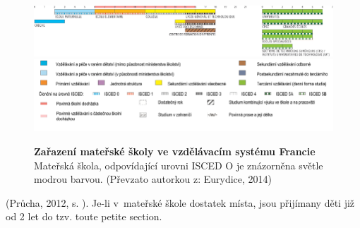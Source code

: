 		\begin{figure} [h!]
			\center
			\includegraphics[width=1.0\linewidth]{fotky/msFR.png} \\
			\includegraphics[width=1.0\linewidth]{fotky/msVysvetlivky.png}
			\caption{ \textbf{Zařazení mateřské školy ve vzdělávacím systému Francie} Mateřská škola, odpovídající urovni ISCED O je znázorněna světle modrou barvou.
			(Převzato autorkou z: Eurydice, 2014)
			}
			\label{obr:msFR}
		\end{figure}

		(Průcha, 2012, s. ). 
		Je-li v~mateřské škole dostatek místa, jsou přijímany děti již od 2 let do tzv. toute petite section. 

